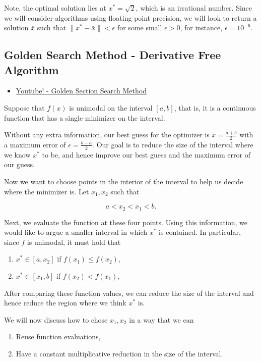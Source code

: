 Note, the optimal solution lies at $x^* = \sqrt{2}$, which is an irrational number.  Since we will consider algorithms using floating point precision, we will look to return a solution $\bar x$ such that $\|x^* - \bar x\| < \epsilon$ for some small $\epsilon > 0$, for instance, $\epsilon = 10^{-6}$.


\subsection{Golden Search Method - Derivative Free Algorithm}
\begin{resource}
\begin{itemize}
\item \href{https://www.youtube.com/watch?v=hLm8xfwWYPw}{Youtube! - Golden Section Search Method}
\end{itemize}
\end{resource}

Suppose that $f(x)$ is unimodal on the interval $[a,b]$, that is, it is a continuous function that has a single minimizer on the interval.  

Without any extra information, our best guess for the optimizer is $\bar x = \tfrac{a+ b}{2}$ with a maximum error of $\epsilon = \tfrac{b-a}{2}$.    Our goal is to reduce the size of the interval where we know $x^*$ to be, and hence improve our best guess and the maximum error of our guess.


 Now we want to choose points in the interior of the interval to help us decide where the minimizer is.  Let $x_1, x_2$ such that 

$$
a < x_2 < x_1 < b.
$$

Next, we evaluate the function at these four points.  Using this information, we would like to argue a smaller interval in which $x^*$ is contained.  In particular, since $f$ is unimodal, it must hold that 
\begin{enumerate}
\item $x^* \in [a, x_2]$ if  $f(x_1) \leq f(x_2)$, 
\item $x^* \in [x_1,b]$ if $f(x_2) < f(x_1)$,
\end{enumerate}


After comparing these function values, we can reduce the size of the interval and hence reduce the region where we think $x^*$ is.   


We will now discuss how to chose $x_1,x_2$ in a way that we can 
\begin{enumerate}
\item Reuse function evaluations,
\item Have a constant multiplicative reduction in the size of the interval.
\end{enumerate}


